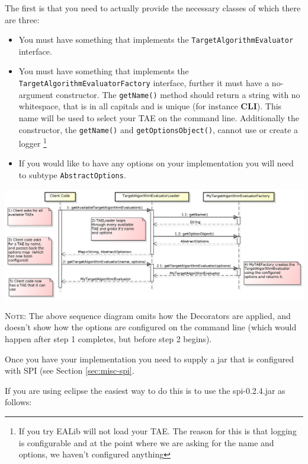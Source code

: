 \documentclass[11pt,letterpaper,oneside]{article}
\begin{document}
The first is that you need to actually provide the necessary classes of which there are three:

\begin{itemize}
\item You must have something that implements the \texttt{TargetAlgorithmEvaluator} interface.
\item You must have something that implements the \texttt{TargetAlgorithmEvaluatorFactory} interface, further it must have a no-argument constructor. The \texttt{getName()} method should return a string with no whitespace, that is in all capitals and is unique (for instance \textbf{CLI}). This name will be used to select your TAE on the command line. Additionally the constructor, the \texttt{getName()} and \texttt{getOptionsObject()}, cannot use or create a logger \footnote{If you try EALib will not load your TAE. The reason for this is that logging is configurable and at the point where we are asking for the name and options, we haven't configured anything}

\item If you would like to have any options on your implementation you will need to subtype \texttt{AbstractOptions}.
\end{itemize}


\begin{center}
\includegraphics[scale=0.50]{img/UML/TAEConstruction.png}
\end{center}

\textsc{Note:} The above sequence diagram omits how the Decorators are applied, and doesn't show how the options are configured on the command line (which would happen after step 1 completes, but before step 2 begins).





Once you have your implementation you need to supply a jar that is configured with SPI (see Section \ref{sec:misc-spi}. 

If you are using eclipse the easiest way to do this is to use the spi-0.2.4.jar as follows:
\end{document}
